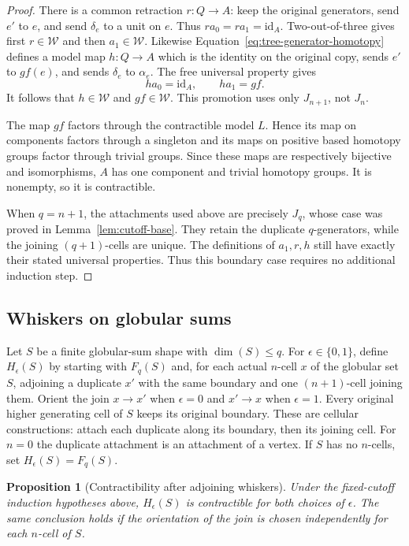 \documentclass[11pt,letterpaper]{article}
\numberwithin{equation}{section}
\theoremstyle{plain}
\newtheorem{proposition}[theorem]{Proposition}
\theoremstyle{definition}
\theoremstyle{remark}
\begin{document}
\begin{proof}
There is a common retraction $r:Q\to A$: keep the original
generators, send $e'$ to $e$, and send $\delta_e$ to a unit on
$e$.  Thus $ra_0=ra_1=\mathrm{id}_A$.  Two-out-of-three gives first
$r\in\mathcal W$ and then $a_1\in\mathcal W$.
Likewise Equation~\eqref{eq:tree-generator-homotopy} defines a
model map $h:Q\to A$ which is the identity on the original copy,
sends $e'$ to $gf(e)$, and sends $\delta_e$ to $\alpha_e$.
The free universal property gives
\[
 ha_0=\mathrm{id}_A,\qquad ha_1=gf.
\]
It follows that $h\in\mathcal W$ and $gf\in\mathcal W$.
This promotion uses only $J_{n+1}$, not $J_n$.

The map $gf$ factors through the contractible model $L$.  Hence
its map on components factors through a singleton and its maps
on positive based homotopy groups factor through trivial groups.
Since these maps are respectively bijective and isomorphisms,
$A$ has one component and trivial homotopy groups.  It is
nonempty, so it is contractible.

When $q=n+1$, the attachments used above are precisely $J_q$,
whose case was proved in Lemma~\ref{lem:cutoff-base}.  They retain
the duplicate $q$-generators, while the joining $(q+1)$-cells
are unique.  The definitions of $a_1,r,h$ still have exactly
their stated universal properties.  Thus this boundary case
requires no additional induction step.
\end{proof}

\subsection{Whiskers on globular sums}

Let $S$ be a finite globular-sum shape with $\dim(S)\leq q$.
For $\epsilon\in\{0,1\}$, define $H_\epsilon(S)$ by starting
with $F_q(S)$ and, for each actual $n$-cell $x$ of the globular
set $S$, adjoining a duplicate $x'$ with the same boundary and
one $(n+1)$-cell joining them.  Orient the join $x\to x'$ when
$\epsilon=0$ and $x'\to x$ when $\epsilon=1$.  Every original
higher generating cell of $S$ keeps its original boundary.
These are cellular constructions: attach each duplicate along
its boundary, then its joining cell.  For $n=0$ the duplicate
attachment is an attachment of a vertex.  If $S$ has no
$n$-cells, set $H_\epsilon(S)=F_q(S)$.

\begin{proposition}[Contractibility after adjoining whiskers]
\label{prop:whiskered-shape}
Under the fixed-cutoff induction hypotheses above,
$H_\epsilon(S)$ is contractible for both choices of $\epsilon$.
The same conclusion holds if the orientation of the join is
chosen independently for each $n$-cell of $S$.
\end{proposition}
\end{document}
